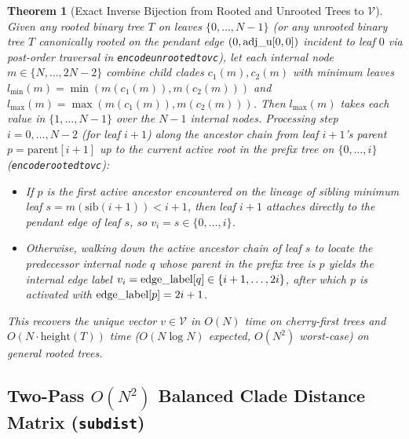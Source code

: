 \documentclass[11pt,a4paper]{article}
\makeatletter
\DeclareRobustCommand{\_}{\ifmmode\nfss@text{\textunderscore}\else\textunderscore\allowbreak\fi}
\newtheorem{theorem}{Theorem}[section]
\theoremstyle{definition}
\makeatother
\begin{document}
\begin{theorem}[Exact Inverse Bijection from Rooted and Unrooted Trees to $\mathcal{V}$]
\label{thm:inverse}
Given any rooted binary tree $T$ on leaves $\{0, \dots, N-1\}$ (or any unrooted binary tree $T$ canonically rooted on the pendant edge $(0, \text{adj\_u}[0, 0])$ incident to leaf $0$ via post-order traversal in \texttt{encode\_unrooted\_to\_v\_c}), let each internal node $m \in \{N, \dots, 2N-2\}$ combine child clades $c_1(m), c_2(m)$ with minimum leaves $l_{\min}(m) = \min(m(c_1(m)), m(c_2(m)))$ and $l_{\max}(m) = \max(m(c_1(m)), m(c_2(m)))$. Then $l_{\max}(m)$ takes each value in $\{1, \dots, N-1\}$ over the $N-1$ internal nodes. Processing step $i = 0, \dots, N-2$ (for leaf $i + 1$) along the ancestor chain from leaf $i+1$'s parent $p = \text{parent}[i+1]$ up to the current active root in the prefix tree on $\{0, \dots, i\}$ (\texttt{encode\_rooted\_to\_v\_c}):
\begin{itemize}
    \item If $p$ is the first active ancestor encountered on the lineage of sibling minimum leaf $s = m(\text{sib}(i+1)) < i+1$, then leaf $i+1$ attaches directly to the pendant edge of leaf $s$, so $v_i = s \in \{0, \dots, i\}$.
    \item Otherwise, walking down the active ancestor chain of leaf $s$ to locate the predecessor internal node $q$ whose parent in the prefix tree is $p$ yields the internal edge label $v_i = \text{edge\_label}[q] \in \{i+1, \dots, 2i\}$, after which $p$ is activated with $\text{edge\_label}[p] = 2i + 1$.
\end{itemize}
This recovers the unique vector $v \in \mathcal{V}$ in $O(N)$ time on cherry-first trees and $O(N \cdot \text{height}(T))$ time ($O(N \log N)$ expected, $O(N^2)$ worst-case) on general rooted trees.
\end{theorem}

\subsection{Two-Pass $O(N^2)$ Balanced Clade Distance Matrix (\texttt{subdist})}
\end{document}
